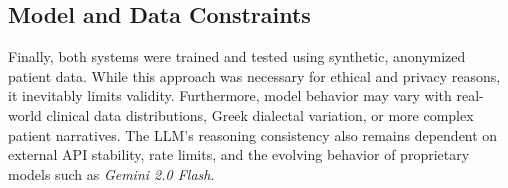 \subsection*{Model and Data Constraints}
Finally, both systems were trained and tested using synthetic, anonymized patient data. While this approach was necessary for ethical and privacy reasons, it inevitably limits validity. Furthermore, model behavior may vary with real-world clinical data distributions, Greek dialectal variation, or more complex patient narratives. The LLM’s reasoning consistency also remains dependent on external API stability, rate limits, and the evolving behavior of proprietary models such as \textit{Gemini 2.0 Flash}.



 



